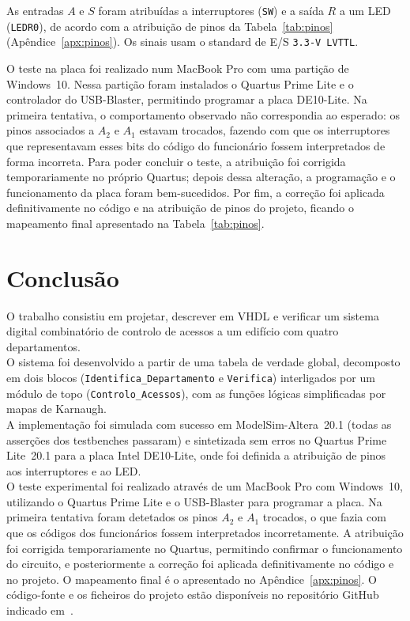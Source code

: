 \documentclass[12pt]{article}
\begin{document}
As entradas $A$ e $S$ foram atribuídas a interruptores (\texttt{SW}) e a saída
$R$ a um LED (\texttt{LEDR0}), de acordo com a atribuição de pinos da
Tabela~\ref{tab:pinos} (Apêndice~\ref{apx:pinos}). Os sinais usam o standard de
E/S \texttt{3.3-V LVTTL}.

O teste na placa foi realizado num MacBook Pro com uma partição de Windows~10.
Nessa partição foram instalados o Quartus Prime Lite e o controlador do
USB-Blaster, permitindo programar a placa DE10-Lite. Na primeira tentativa, o
comportamento observado não correspondia ao esperado: os pinos associados a
$A_2$ e $A_1$ estavam trocados, fazendo com que os interruptores que
representavam esses bits do código do funcionário fossem interpretados de forma
incorreta. Para poder concluir o teste, a atribuição foi corrigida
temporariamente no próprio Quartus; depois dessa alteração, a programação e o
funcionamento da placa foram bem-sucedidos. Por fim, a correção foi aplicada
definitivamente no código e na atribuição de pinos do projeto, ficando o
mapeamento final apresentado na Tabela~\ref{tab:pinos}.

\section{Conclusão} 
O trabalho consistiu em projetar, descrever em VHDL e verificar um sistema
digital combinatório de controlo de acessos a um edifício com quatro
departamentos. \\
O sistema foi desenvolvido a partir de uma tabela de verdade global, decomposto
em dois blocos (\texttt{Identifica\_Departamento} e \texttt{Verifica})
interligados por um módulo de topo (\texttt{Controlo\_Acessos}), com as funções
lógicas simplificadas por mapas de Karnaugh. \\
A implementação foi simulada com sucesso em ModelSim-Altera~20.1 (todas as
asserções dos testbenches passaram) e sintetizada sem erros no Quartus Prime
Lite~20.1 para a placa Intel DE10-Lite, onde foi definida a atribuição de pinos
aos interruptores e ao LED. \\
O teste experimental foi realizado através de um MacBook Pro com Windows~10,
utilizando o Quartus Prime Lite e o USB-Blaster para programar a placa. Na
primeira tentativa foram detetados os pinos $A_2$ e $A_1$ trocados, o que fazia
com que os códigos dos funcionários fossem interpretados incorretamente. A
atribuição foi corrigida temporariamente no Quartus, permitindo confirmar o
funcionamento do circuito, e posteriormente a correção foi aplicada
definitivamente no código e no projeto. O mapeamento final é o apresentado no
Apêndice~\ref{apx:pinos}. O código-fonte e os ficheiros do projeto estão
disponíveis no repositório GitHub indicado em~\cite{repositorio}.
\end{document}
